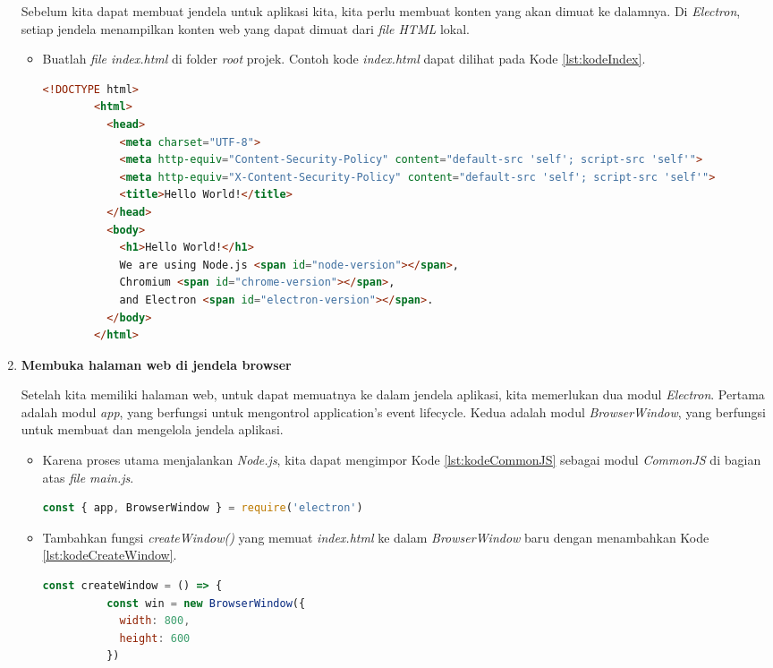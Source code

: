 \begin{enumerate}
    Sebelum kita dapat membuat jendela untuk aplikasi kita, kita perlu membuat konten yang akan dimuat ke dalamnya. Di \textit{Electron}, setiap jendela menampilkan konten web yang dapat dimuat dari \textit{file HTML} lokal.
    \begin{itemize}
        \item Buatlah \textit{file index.html} di folder \textit{root} projek. Contoh kode \textit{index.html} dapat dilihat pada Kode \ref{lst:kodeIndex}.
        \begin{lstlisting}[language=HTML, caption=Contoh kode \textit{index.html}\label{lst:kodeIndex}]
        <!DOCTYPE html>
        <html>
          <head>
            <meta charset="UTF-8">
            <meta http-equiv="Content-Security-Policy" content="default-src 'self'; script-src 'self'">
            <meta http-equiv="X-Content-Security-Policy" content="default-src 'self'; script-src 'self'">
            <title>Hello World!</title>
          </head>
          <body>
            <h1>Hello World!</h1>
            We are using Node.js <span id="node-version"></span>,
            Chromium <span id="chrome-version"></span>,
            and Electron <span id="electron-version"></span>.
          </body>
        </html>
        \end{lstlisting}
    \end{itemize}
    \item \textbf{Membuka halaman web di jendela browser}
    
    Setelah kita memiliki halaman web, untuk dapat memuatnya ke dalam jendela aplikasi, kita memerlukan dua modul \textit{Electron}. Pertama adalah modul \textit{app}, yang berfungsi untuk mengontrol application's event lifecycle. Kedua adalah modul \textit{BrowserWindow}, yang berfungsi untuk membuat dan mengelola jendela aplikasi.
    \begin{itemize}
        \item Karena proses utama menjalankan \textit{Node.js}, kita dapat mengimpor Kode \ref{lst:kodeCommonJS} sebagai modul \textit{CommonJS} di bagian atas \textit{file main.js}.
        \begin{lstlisting}[language=JavaScript, caption=Kode impor modul \textit{CommondJS}\label{lst:kodeCommonJS}]
        const { app, BrowserWindow } = require('electron')
        \end{lstlisting}
        \item Tambahkan fungsi \textit{createWindow()} yang memuat \textit{index.html} ke dalam \textit{BrowserWindow} baru dengan menambahkan Kode \ref{lst:kodeCreateWindow}.
        \begin{lstlisting}[language=JavaScript, caption=Fungsi CreateWindow\label{lst:kodeCreateWindow}]
        const createWindow = () => {
          const win = new BrowserWindow({
            width: 800,
            height: 600
          })
        

\end{lstlisting}
\end{itemize}
\end{enumerate}
